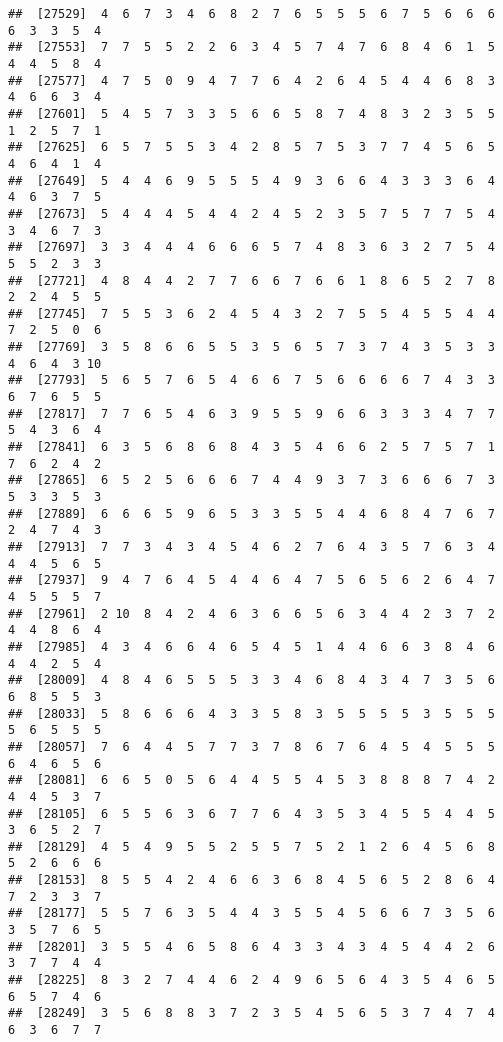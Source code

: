 \documentclass[
]{book}
\begin{document}
\begin{verbatim}
##  [27529]  4  6  7  3  4  6  8  2  7  6  5  5  5  6  7  5  6  6  6  6  3  3  5  4
##  [27553]  7  7  5  5  2  2  6  3  4  5  7  4  7  6  8  4  6  1  5  4  4  5  8  4
##  [27577]  4  7  5  0  9  4  7  7  6  4  2  6  4  5  4  4  6  8  3  4  6  6  3  4
##  [27601]  5  4  5  7  3  3  5  6  6  5  8  7  4  8  3  2  3  5  5  1  2  5  7  1
##  [27625]  6  5  7  5  5  3  4  2  8  5  7  5  3  7  7  4  5  6  5  4  6  4  1  4
##  [27649]  5  4  4  6  9  5  5  5  4  9  3  6  6  4  3  3  3  6  4  4  6  3  7  5
##  [27673]  5  4  4  4  5  4  4  2  4  5  2  3  5  7  5  7  7  5  4  3  4  6  7  3
##  [27697]  3  3  4  4  4  6  6  6  5  7  4  8  3  6  3  2  7  5  4  5  5  2  3  3
##  [27721]  4  8  4  4  2  7  7  6  6  7  6  6  1  8  6  5  2  7  8  2  2  4  5  5
##  [27745]  7  5  5  3  6  2  4  5  4  3  2  7  5  5  4  5  5  4  4  7  2  5  0  6
##  [27769]  3  5  8  6  6  5  5  3  5  6  5  7  3  7  4  3  5  3  3  4  6  4  3 10
##  [27793]  5  6  5  7  6  5  4  6  6  7  5  6  6  6  6  7  4  3  3  6  7  6  5  5
##  [27817]  7  7  6  5  4  6  3  9  5  5  9  6  6  3  3  3  4  7  7  5  4  3  6  4
##  [27841]  6  3  5  6  8  6  8  4  3  5  4  6  6  2  5  7  5  7  1  7  6  2  4  2
##  [27865]  6  5  2  5  6  6  6  7  4  4  9  3  7  3  6  6  6  7  3  5  3  3  5  3
##  [27889]  6  6  6  5  9  6  5  3  3  5  5  4  4  6  8  4  7  6  7  2  4  7  4  3
##  [27913]  7  7  3  4  3  4  5  4  6  2  7  6  4  3  5  7  6  3  4  4  4  5  6  5
##  [27937]  9  4  7  6  4  5  4  4  6  4  7  5  6  5  6  2  6  4  7  4  5  5  5  7
##  [27961]  2 10  8  4  2  4  6  3  6  6  5  6  3  4  4  2  3  7  2  4  4  8  6  4
##  [27985]  4  3  4  6  6  4  6  5  4  5  1  4  4  6  6  3  8  4  6  4  4  2  5  4
##  [28009]  4  8  4  6  5  5  5  3  3  4  6  8  4  3  4  7  3  5  6  6  8  5  5  3
##  [28033]  5  8  6  6  6  4  3  3  5  8  3  5  5  5  5  3  5  5  5  5  6  5  5  5
##  [28057]  7  6  4  4  5  7  7  3  7  8  6  7  6  4  5  4  5  5  5  6  4  6  5  6
##  [28081]  6  6  5  0  5  6  4  4  5  5  4  5  3  8  8  8  7  4  2  4  4  5  3  7
##  [28105]  6  5  5  6  3  6  7  7  6  4  3  5  3  4  5  5  4  4  5  3  6  5  2  7
##  [28129]  4  5  4  9  5  5  2  5  5  7  5  2  1  2  6  4  5  6  8  5  2  6  6  6
##  [28153]  8  5  5  4  2  4  6  6  3  6  8  4  5  6  5  2  8  6  4  7  2  3  3  7
##  [28177]  5  5  7  6  3  5  4  4  3  5  5  4  5  6  6  7  3  5  6  3  5  7  6  5
##  [28201]  3  5  5  4  6  5  8  6  4  3  3  4  3  4  5  4  4  2  6  3  7  7  4  4
##  [28225]  8  3  2  7  4  4  6  2  4  9  6  5  6  4  3  5  4  6  5  6  5  7  4  6
##  [28249]  3  5  6  8  8  3  7  2  3  5  4  5  6  5  3  7  4  7  4  6  3  6  7  7

\end{verbatim}
\end{document}
